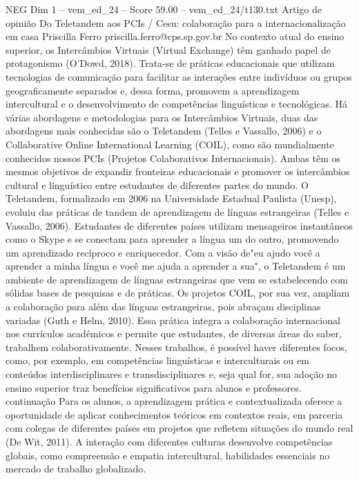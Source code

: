 \begin{textsample}{NEG Dim 1 – vem\_ed\_24 – Score 59.00 – vem\_ed\_24/t130.txt}  \label{ex:f1_neg_137}
Artigo de opinião Do Teletandem aos PCIs / Cesu: colaboração para a internacionalização em casa Priscilla Ferro priscilla.ferro@cps.sp.gov.br No contexto atual do ensino superior, os Intercâmbios Virtuais (Virtual Exchange) têm ganhado papel de protagonismo (O'Dowd, 2018).
Trata-se de práticas educacionais que utilizam tecnologias de comunicação para facilitar as interações entre indivíduos ou grupos geograficamente separados e, dessa forma, promovem a aprendizagem intercultural e o desenvolvimento de competências linguísticas e tecnológicas.
Há várias abordagens e metodologias para os Intercâmbios Virtuais, duas das abordagens mais conhecidas são o Teletandem (Telles e Vassallo, 2006) e o Collaborative Online International Learning (COIL), como são mundialmente conhecidos nossos PCIs (Projetos Colaborativos Internacionais).
Ambas têm os mesmos objetivos de expandir fronteiras educacionais e promover os intercâmbios cultural e linguístico entre estudantes de diferentes partes do mundo.
O Teletandem, formalizado em 2006 na Universidade Estadual Paulista (Unesp), evoluiu das práticas de tandem de aprendizagem de línguas estrangeiras (Telles e Vassallo, 2006).
Estudantes de diferentes países utilizam mensageiros instantâneos como o Skype e se conectam para aprender a língua um do outro, promovendo um aprendizado recíproco e enriquecedor.
Com a visão de"eu ajudo você a aprender a minha língua e você me ajuda a aprender a sua", o Teletandem é um ambiente de aprendizagem de línguas estrangeiras que vem se estabelecendo com sólidas bases de pesquisas e de práticas.
Os projetos COIL, por sua vez, ampliam a colaboração para além das línguas estrangeiras, pois abraçam disciplinas variadas (Guth e Helm, 2010).
Essa prática integra a colaboração internacional nos currículos acadêmicos e permite que estudantes, de diversas áreas do saber, trabalhem colaborativamente.
Nesses trabalhos, é possível haver diferentes focos, como, por exemplo, em competências linguísticas e interculturais ou em conteúdos interdisciplinares e transdisciplinares e, seja qual for, sua adoção no ensino superior traz benefícios significativos para alunos e professores. continuação Para os alunos, a aprendizagem prática e contextualizada oferece a oportunidade de aplicar conhecimentos teóricos em contextos reais, em parceria com colegas de diferentes países em projetos que refletem situações do mundo real (De Wit, 2011).
A interação com diferentes culturas desenvolve competências globais, como compreensão e empatia intercultural, habilidades essenciais no mercado de trabalho globalizado.

\end{textsample}
